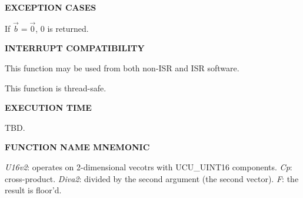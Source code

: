 \noindent\textbf{EXCEPTION CASES}
\begin{list}{}{\setlength{\leftmargin}{0.25in}\setlength{\topsep}{0.0in}}
\item If $\vec{b} = \vec{0}$, 0 is returned.
\end{list}
\vspace{2.8ex}

\noindent\textbf{INTERRUPT COMPATIBILITY}
\begin{list}{}{\setlength{\leftmargin}{0.25in}\setlength{\topsep}{0.0in}}
\item This function may be used from both non-ISR and ISR software.
\item This function is thread-safe.
\end{list}
\vspace{2.8ex}

\noindent\textbf{EXECUTION TIME}
\begin{list}{}{\setlength{\leftmargin}{0.25in}\setlength{\topsep}{0.0in}}
\item TBD.
\end{list}
\vspace{2.8ex}

\noindent\textbf{FUNCTION NAME MNEMONIC}
\begin{list}{}{\setlength{\leftmargin}{0.25in}\setlength{\topsep}{0.0in}}
\item \emph{U16v2}:  operates on 2-dimensional vecotrs with UCU\_UINT16 components.
      \emph{Cp}:     cross-product.
      \emph{Diva2}:  divided by the second argument (the second vector).
      \emph{F}:      the result is floor'd.
\end{list}


